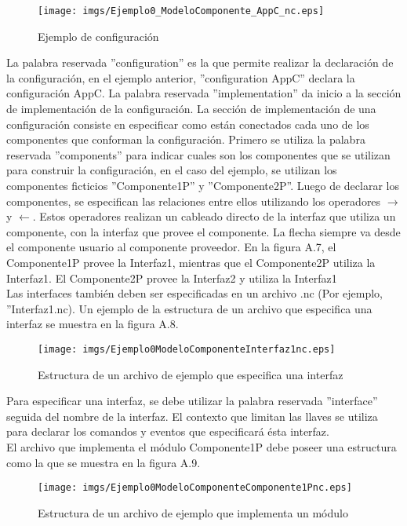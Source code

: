 \begin{figure}[H]
	\centering
 	\texttt{[image: imgs/Ejemplo0\_ModeloComponente\_AppC\_nc.eps]} 
 	\caption{Ejemplo de configuración}
\end{figure}

La palabra reservada ''configuration'' es la que permite realizar la declaración de la configuración, en el ejemplo anterior, ''configuration AppC'' declara la configuración AppC. La palabra reservada ''implementation'' da inicio a la sección de implementación de la configuración. La sección de implementación de una configuración consiste en especificar como están conectados cada uno de los componentes que conforman la configuración. Primero se utiliza la palabra reservada ''components'' para indicar cuales son los componentes que se utilizan para construir la configuración, en el caso del ejemplo, se utilizan los componentes ficticios ''Componente1P'' y ''Componente2P''. Luego de declarar los componentes, se especifican las relaciones entre ellos utilizando los operadores $\rightarrow$ y $\leftarrow$. Estos operadores realizan un cableado directo de la interfaz que utiliza un componente, con la interfaz que provee el componente. La flecha siempre va desde el componente usuario al componente proveedor. En la figura A.7, el Componente1P provee la Interfaz1, mientras que el Componente2P utiliza la Interfaz1. El Componente2P provee la Interfaz2 y utiliza la Interfaz1\\

Las interfaces también deben ser especificadas en un archivo .nc (Por ejemplo, ''Interfaz1.nc). Un ejemplo de la estructura de un archivo que especifica una interfaz se muestra en la figura A.8.

\begin{figure}[H]
	\centering
 	\texttt{[image: imgs/Ejemplo0ModeloComponenteInterfaz1nc.eps]} 
 	\caption{Estructura de un archivo de ejemplo que especifica una interfaz}
\end{figure}

Para especificar una interfaz, se debe utilizar la palabra reservada ''interface'' seguida del nombre de la interfaz. El contexto que limitan las llaves se utiliza para declarar los comandos y eventos que especificará ésta interfaz.\\

El archivo que implementa el módulo Componente1P debe poseer una estructura como la que se muestra en la figura A.9.

\begin{figure}[H]
	\centering
 	\texttt{[image: imgs/Ejemplo0ModeloComponenteComponente1Pnc.eps]} 
 	\caption{Estructura de un archivo de ejemplo que implementa un módulo}
\end{figure}

